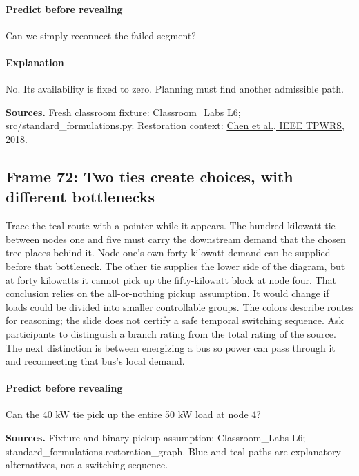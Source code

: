 \documentclass[11pt]{article}
\begin{document}
\paragraph{Predict before revealing}Can we simply reconnect the failed segment?
\paragraph{Explanation}No. Its availability is fixed to zero. Planning must find another admissible path.
\par\nopagebreak\begin{minipage}{\linewidth}{\footnotesize\color{slate}\textbf{Sources.} Fresh classroom fixture: Classroom\_Labs L6; src/standard\_formulations.py. Restoration context: \href{https://doi.org/10.1109/TPWRS.2017.2720122}{Chen et al., IEEE TPWRS, 2018}.\par}\end{minipage}\par\medskip
\subsection*{Frame 72: Two ties create choices, with different bottlenecks}
Trace the teal route with a pointer while it appears. The hundred-kilowatt tie between nodes one and five must carry the downstream demand that the chosen tree places behind it. Node one's own forty-kilowatt demand can be supplied before that bottleneck. The other tie supplies the lower side of the diagram, but at forty kilowatts it cannot pick up the fifty-kilowatt block at node four. That conclusion relies on the all-or-nothing pickup assumption. It would change if loads could be divided into smaller controllable groups. The colors describe routes for reasoning; the slide does not certify a safe temporal switching sequence. Ask participants to distinguish a branch rating from the total rating of the source. The next distinction is between energizing a bus so power can pass through it and reconnecting that bus's local demand.\par
\paragraph{Predict before revealing}Can the 40 kW tie pick up the entire 50 kW load at node 4?
\par\nopagebreak\begin{minipage}{\linewidth}{\footnotesize\color{slate}\textbf{Sources.} Fixture and binary pickup assumption: Classroom\_Labs L6; standard\_formulations.restoration\_graph. Blue and teal paths are explanatory alternatives, not a switching sequence.\par}\end{minipage}\par\medskip
\end{document}
